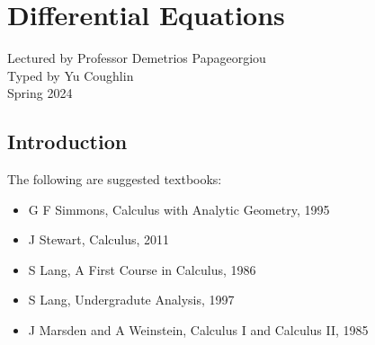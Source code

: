 \documentclass[../Year1/Year1.tex]{subfiles}
\begin{document}
\chapter{Differential Equations}
\renewcommand*\thesection{\arabic{section}}
\setcounter{section}{-1}
Lectured by Professor Demetrios Papageorgiou \\ Typed by Yu Coughlin \\
Spring 2024

\section{Introduction}


The following are suggested textbooks:
\begin{itemize}
    \item G F Simmons, Calculus with Analytic Geometry, 1995
    \item J Stewart, Calculus, 2011
    \item S Lang, A First Course in Calculus, 1986
    \item S Lang, Undergradute Analysis, 1997
    \item J Marsden and A Weinstein, Calculus I and Calculus II, 1985
\end{itemize}

\tableofcontents\pagebreak
\end{document}
